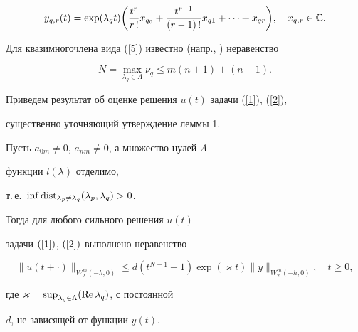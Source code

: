 \begin{equation}  


\label{6}


y_{q,r}(t)=\exp(\lambda_q t)\bigg(\frac{t^r}{r\,!}x_{q_0}+ 


\frac{t^{r-1}}{(r-1)\,!}x_{q1}+\dotsb+x_{qr}\bigg),\quad 


x_{q,r}\in\Bbb C. 


\end{equation}  


 


Для квазимногочлена вида (\ref{5}) известно (напр., \cite{2}) неравенство


\begin{equation} 


\label{7} 


N=\max_{\lambda_q\in\Lambda}\nu_q\le m(n+1)+(n-1). 


\end{equation} 


 


Приведем результат об оценке решения $u(t)$ задачи (\ref{1}), (\ref{2}), 


существенно уточняющий утверждение леммы 1. 


 


\begin{thm} 


Пусть $a_{0m}\ne 0$, $a_{nm}\ne 0$, а множество нулей $\Lambda$ 


функции $l(\lambda)$ отделимо, 


т.\,е.~$\inf\dist_{\lambda_p\ne\lambda_q}(\lambda_p,\lambda_q)>0$. 


Тогда для любого сильного решения $u(t)$ 


задачи $(\ref{1})$, $(\ref{2})$ выполнено неравенство 


\begin{equation} 


\label{8} 


\|u(t+\cdot)\|_{W^m_2(-h,0)}\le d(t^{N-1}+1)\exp(\varkappa t) 


\|y\|_{W^m_2(-h,0)},\quad t\ge 0, 


\end{equation} 


где $\varkappa=\sup_{\lambda_q\in\Lambda}(\operatorname{Re}\lambda_q)$, с постоянной 


$d$, не зависящей от функции $y(t)$. 


\end{thm} 


